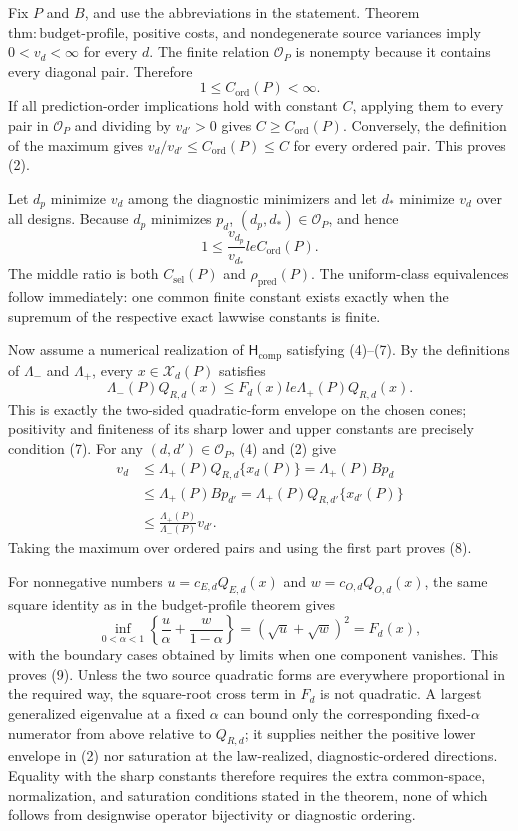 Fix \(P\) and \(B\), and use the abbreviations in the statement.  Theorem~\(\mathrm{thm{:}budget\text{-}profile}\), positive costs, and nondegenerate source variances imply \(0<v_d<\infty\) for every \(d\).  The finite relation \(\mathcal O_P\) is nonempty because it contains every diagonal pair.  Therefore
\[
 1\le C_{\mathrm{ord}}(P)<\infty. \tag{1}
\]
If all prediction-order implications hold with constant \(C\), applying them to every pair in \(\mathcal O_P\) and dividing by \(v_{d'}>0\) gives \(C\ge C_{\mathrm{ord}}(P)\).  Conversely, the definition of the maximum gives \(v_d/v_{d'}\le C_{\mathrm{ord}}(P)\le C\) for every ordered pair.  This proves (2).

Let \(d_p\) minimize \(v_d\) among the diagnostic minimizers and let \(d_*\) minimize \(v_d\) over all designs.  Because \(d_p\) minimizes \(p_d\), \((d_p,d_*)\in\mathcal O_P\), and hence
\[
 1\le\frac{v_{d_p}}{v_{d_*}}le C_{\mathrm{ord}}(P).
\]
The middle ratio is both \(C_{\mathrm{sel}}(P)\) and \(\rho_{\mathrm{pred}}(P)\).  The uniform-class equivalences follow immediately: one common finite constant exists exactly when the supremum of the respective exact lawwise constants is finite.

Now assume a numerical realization of \(\mathsf H_{\mathrm{comp}}\) satisfying (4)--(7).  By the definitions of \(\Lambda_-\) and \(\Lambda_+\), every \(x\in\mathcal X_d(P)\) satisfies
\[
 \Lambda_-(P)Q_{R,d}(x)\le F_d(x)le\Lambda_+(P)Q_{R,d}(x). \tag{2}
\]
This is exactly the two-sided quadratic-form envelope on the chosen cones; positivity and finiteness of its sharp lower and upper constants are precisely condition (7).  For any \((d,d')\in\mathcal O_P\), (4) and (2) give
\[
\begin{aligned}
 v_d
 &\le\Lambda_+(P)Q_{R,d}\{x_d(P)\}
 =\Lambda_+(P)Bp_d\\
 &\le\Lambda_+(P)Bp_{d'}
 =\Lambda_+(P)Q_{R,d'}\{x_{d'}(P)\}\\
 &\le\frac{\Lambda_+(P)}{\Lambda_-(P)}v_{d'}.
\end{aligned}
\]
Taking the maximum over ordered pairs and using the first part proves (8).

For nonnegative numbers \(u= c_{E,d}Q_{E,d}(x)\) and \(w=c_{O,d}Q_{O,d}(x)\), the same square identity as in the budget-profile theorem gives
\[
 \inf_{0<\alpha<1}\left\{\frac u\alpha+\frac w{1-\alpha}\right\}
 =(\sqrt u+\sqrt w)^2=F_d(x), \tag{3}
\]
with the boundary cases obtained by limits when one component vanishes.  This proves (9).  Unless the two source quadratic forms are everywhere proportional in the required way, the square-root cross term in \(F_d\) is not quadratic.  A largest generalized eigenvalue at a fixed \(\alpha\) can bound only the corresponding fixed-\(\alpha\) numerator from above relative to \(Q_{R,d}\); it supplies neither the positive lower envelope in (2) nor saturation at the law-realized, diagnostic-ordered directions.  Equality with the sharp constants therefore requires the extra common-space, normalization, and saturation conditions stated in the theorem, none of which follows from designwise operator bijectivity or diagnostic ordering.
